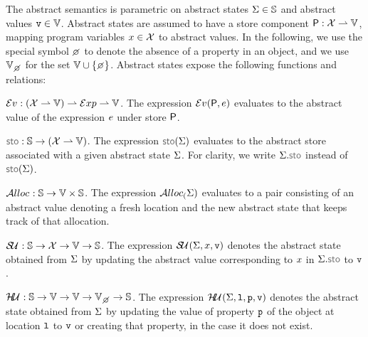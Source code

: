 The abstract semantics is parametric on abstract states $\Sigma \in \mathbb{S}$ and abstract values $\mathtt{v} \in \mathbb{V}$.
Abstract states are assumed to have a store component ${\sf P}: \mathcal{X} \rightharpoonup \mathbb{V}$, mapping program variables $x \in \mathcal{X}$ to abstract values. 
In the following, we use the special symbol $\none$ to denote the absence of a property in an object, and we use $\setext{\absvals}{\none}$ for the set $\absvals \cup \{ \none \}$.
Abstract states expose the following functions and relations: 
\begin{description}
\setlength{\itemsep}{0.2em}
  \item[\jsil Expression Evaluation,] $\mathcal{E}v_{} :  (\mathcal{X} \rightharpoonup \mathbb{V})  \rightharpoonup \mathcal{E}xp \rightharpoonup \mathbb{V}$. 
  	The expression $\mathcal{E}v_{}({\sf P}, e)$ evaluates to the abstract value of the \jsil expression $e$ under store ${\sf P}$. 
            
  \item[Store Selector,] $\stosel : \absstates \rightarrow (\jvars \partialmap \absvals)$. The expression $\stosel(\absstate)$ evaluates to the abstract store associated with a given abstract state $\Sigma$. For clarity, we write $\absstate.\stosel$ instead of $\stosel(\absstate)$. 

  \item[Heap Allocation,] $\mathcal{A}lloc_{}: \mathbb{S} \rightarrow \mathbb{V} \times \mathbb{S}$.   The expression $\mathcal{A}lloc_{(}\Sigma)$ evaluates to a pair consisting
          of an abstract value denoting a fresh location and the new abstract state that keeps track of that allocation. %
%             
  \item[Store Update,] $\mathcal{S\!U}_{}: \mathbb{S} \rightarrow \mathcal{X} \rightarrow \mathbb{V} \rightarrow \mathbb{S}$. 
             The expression $\mathcal{S\!U}_{}(\Sigma, x, \mathtt{v})$ denotes the abstract state obtained from $\Sigma$ 
             by updating the abstract value corresponding to $x$ in $\absstate.\stosel$ to $\mathtt{v}$. 

   \item[Heap Update,] $\hpupdt{} : \absstates \rightarrow \absvals \rightarrow \absvals \rightarrow \setext{\absvals}{\none} \rightarrow \absstates$. 
             The expression $\mathcal{H\!U}_{}(\Sigma, \mathtt{l}, \mathtt{p}, \mathtt{v})$ denotes the abstract state obtained from $\Sigma$ 
             by updating the value of property $\mathtt{p}$ of the object at location $\mathtt{l}$ to $\mathtt{v}$ or creating that property, in the
             case it does not exist.
                   

\end{description}
